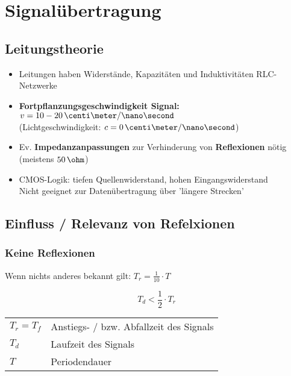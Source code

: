\section{Signalübertragung}

\subsection{Leitungstheorie}

\begin{itemize}
    \item Leitungen haben Widerstände, Kapazitäten und Induktivitäten \textrightarrow RLC-Netzwerke
    \item \textbf{Fortpflanzungsgeschwindigkeit Signal:} $v = 10 - 20 \, \centi \meter / \nano \second$ \\
        (Lichtgeschwindigkeit: $c = 0 \, \centi \meter / \nano \second$)
    \item Ev. \textbf{Impedanzanpassungen} zur Verhinderung von \textbf{Reflexionen} nötig (meistens $50 \, \ohm$)
    \item CMOS-Logik: tiefen Quellenwiderstand, hohen Eingangswiderstand \\
        \textrightarrow Nicht geeignet zur Datenübertragung über 'längere Strecken'
\end{itemize}


\subsection{Einfluss / Relevanz von Refelxionen}

\subsubsection{Keine Reflexionen}

Wenn nichts anderes bekannt gilt: $T_r = \frac{1}{10} \cdot T$ 

\begin{minipage}[c]{0.3\columnwidth}
    $$ \boxed{ T_d < \frac{1}{2} \cdot T_r} $$
\end{minipage}
\hfill
\begin{minipage}[c]{0.68\columnwidth}
    \begin{tabular}{ll}
        $T_r = T_f$ & Anstiegs- / bzw. Abfallzeit des Signals \\
        $T_d$       & Laufzeit des Signals \\
        $T$         & Periodendauer
    \end{tabular}
\end{minipage}


